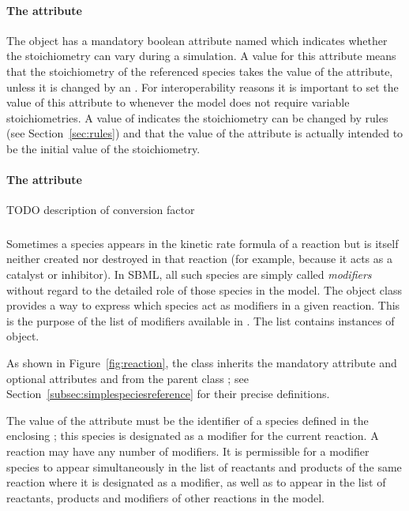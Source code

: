 \paragraph{The  attribute}

The \SpeciesReference object has a mandatory boolean attribute named
 which indicates whether the stoichiometry can
vary during a simulation. 
A value  for this attribute means that the stoichiometry of the referenced species 
takes the value of the  attribute, unless it is changed by an \InitialAssignment.
For interoperability reasons it is important to set the value of this attribute to 
 whenever the model does not require variable stoichiometries.
A value of  indicates the stoichiometry 
can be changed by rules (see Section~\ref{sec:rules}) and
that the value of the  attribute is actually intended to be the initial
value of the stoichiometry.

\paragraph{The  attribute}

TODO description of conversion factor

\subsubsection{}
\label{subsec:modifierreference}

Sometimes a species appears in the kinetic rate formula of a
reaction but is itself neither created nor destroyed in that
reaction (for example, because it acts as a catalyst or
inhibitor).  In SBML, all such species are simply called
\emph{modifiers} without regard to the detailed role of those
species in the model.  The \Reaction object class provides a way to
express which species act as modifiers in a given reaction.  This
is the purpose of the list of modifiers available in \Reaction.
The list contains instances of \ModifierSpeciesReference
object.

As shown in Figure~\vref{fig:reaction}, the
\ModifierSpeciesReference class inherits the mandatory attribute
 and optional attributes  and 
from the parent class \SimpleSpeciesReference; see
Section~\ref{subsec:simplespeciesreference} for their precise
definitions.

The value of the  attribute must be the identifier of a
species defined in the enclosing \Model; this species is
designated as a modifier for the current reaction.  A reaction may
have any number of modifiers.  It is permissible for a modifier
species to appear simultaneously in the list of reactants and
products of the same reaction where it is designated as a
modifier, as well as to appear in the list of reactants, products
and modifiers of other reactions in the model.

